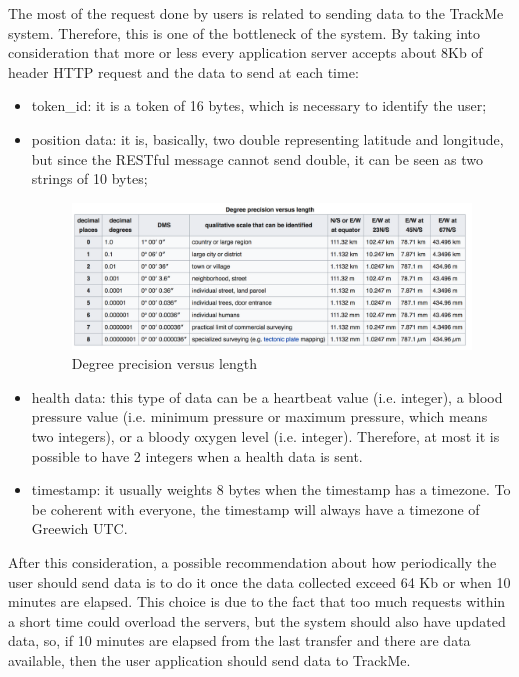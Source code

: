 The most of the request done by users is related to sending data to the TrackMe system. Therefore, this is one of the bottleneck 
of the system. By taking into consideration that more or less every application server accepts about 8Kb of header HTTP request and the data to send at each time:
\begin{itemize}
\item token\_id: it is a token of 16 bytes, which is necessary to identify the user;
\item position data: it is, basically, two double representing latitude and longitude, but since the RESTful message cannot send double, it can be seen as two strings of 10 bytes;
\begin{figure}[H]
\includegraphics[width=\linewidth]{Images/gpsprecision.pdf}
\caption{ Degree precision versus length }
\label{fig:precisiongps}
\end{figure}
\item health data: this type of data can be a heartbeat value (i.e. integer), a blood pressure value (i.e. minimum pressure or maximum pressure, which means two integers), or a bloody oxygen level (i.e. integer). Therefore, at most it is possible to have 2 integers when a health data is sent.
\item timestamp: it usually weights 8 bytes when the timestamp has a timezone. To be coherent with everyone, the timestamp will always have a timezone of Greewich UTC.
\end{itemize}
After this consideration, a possible recommendation about how periodically the user should send data is to do it once the data collected exceed 64 Kb or when 10 minutes are elapsed. This choice is due to the fact that too much requests within a short time could overload the servers, but the system should also have updated data, so, if 10 minutes are elapsed from the last transfer and there are data available, then  the user application should send data to TrackMe.
